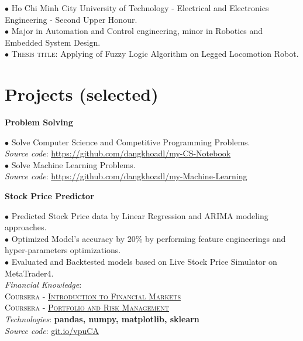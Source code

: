 \documentclass[10pt]{article}
\begin{document}
        \vspace{-5mm}

        $\bullet$ {Ho Chi Minh City University of Technology - Electrical and Electronics Engineering - Second Upper Honour.} \\
        $\bullet$ {Major in Automation and Control engineering, minor in Robotics and Embedded System Design.} \\
        $\bullet$ \textsc{Thesis title}: Applying of Fuzzy Logic Algorithm on Legged Locomotion Robot.


    \section{Projects (selected)}
        \begin{center}
            \textbf{Problem Solving}
        \end{center}
        $\bullet$ Solve Computer Science and Competitive Programming Problems. \\
        	\emph{Source code}: \href{https://github.com/dangkhoadl/my-CS-Notebook}{https://github.com/dangkhoadl/my-CS-Notebook} \\
        $\bullet$ Solve Machine Learning Problems. \\
        	\emph{Source code}: \href{https://github.com/dangkhoadl/my-Machine-Learning}{https://github.com/dangkhoadl/my-Machine-Learning}

        \begin{center}
            \textbf{Stock Price Predictor}
        \end{center}
        $\bullet$ {Predicted Stock Price data by Linear Regression and ARIMA modeling approaches.} \\
        $\bullet$ {Optimized Model's accuracy by 20\% by performing feature engineerings and hyper-parameters optimizations.} \\
        $\bullet$ {Evaluated and Backtested models based on Live Stock Price Simulator on MetaTrader4.} \\
        \emph{Financial Knowledge}: \\
            \hspace*{5mm} \textsc{Coursera - \href{https://www.coursera.org/account/accomplishments/certificate/K8F27A8BM58Q?utm_medium=certificate&utm_source=link&utm_campaign=copybutton_certificate}{Introduction to Financial Markets}} \\
            \hspace*{5mm} \textsc{Coursera - \href{https://www.coursera.org/account/accomplishments/certificate/34BTLCR3KZNR?utm_medium=certificate&utm_source=link&utm_campaign=copybutton_certificate}{Portfolio and Risk Management}} \\
        \emph{Technologies}: \textbf{pandas, numpy, matplotlib, sklearn} \\
        \emph{Source code}: \href{https://git.io/vpuCA}{git.io/vpuCA}
\end{document}
